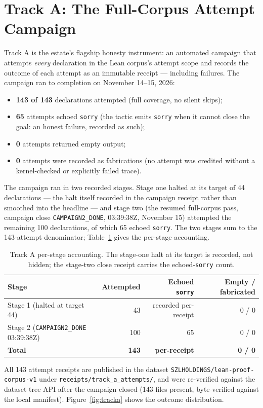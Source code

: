 
\section{Track A: The Full-Corpus Attempt Campaign}
\label{sec:tracka}

Track A is the estate's flagship honesty instrument: an automated campaign that attempts \emph{every} declaration in the Lean corpus's attempt scope and records the outcome of each attempt as an immutable receipt --- including failures. The campaign ran to completion on November 14--15, 2026:

\begin{itemize}
\item \textbf{143 of 143} declarations attempted (full coverage, no silent skips);
\item \textbf{65} attempts echoed \texttt{sorry} (the tactic emits \texttt{sorry} when it cannot close the goal: an honest failure, recorded as such);
\item \textbf{0} attempts returned empty output;
\item \textbf{0} attempts were recorded as fabrications (no attempt was credited without a kernel-checked or explicitly failed trace).
\end{itemize}

The campaign ran in two recorded stages. Stage one halted at its target of 44 declarations --- the halt itself recorded in the campaign receipt rather than smoothed into the headline --- and stage two (the resumed full-corpus pass, campaign close \texttt{CAMPAIGN2\_DONE}, 03:39:38Z, November 15) attempted the remaining 100 declarations, of which 65 echoed \texttt{sorry}. The two stages sum to the 143-attempt denominator; Table~\ref{tab:stages} gives the per-stage accounting.

\begin{table}[htbp]
\centering
\small
\begin{tabular}{lrrr}
\toprule
\textbf{Stage} & \textbf{Attempted} & \textbf{Echoed \texttt{sorry}} & \textbf{Empty / fabricated} \\
\midrule
Stage 1 (halted at target 44) & 43 & recorded per-receipt & 0 / 0 \\
Stage 2 (\texttt{CAMPAIGN2\_DONE} 03:39:38Z) & 100 & 65 & 0 / 0 \\
\midrule
\textbf{Total} & \textbf{143} & \textbf{per-receipt} & \textbf{0 / 0} \\
\bottomrule
\end{tabular}
\caption{Track A per-stage accounting. The stage-one halt at its target is recorded, not hidden; the stage-two close receipt carries the echoed-\texttt{sorry} count.}
\label{tab:stages}
\end{table} All 143 attempt receipts are published in the dataset \texttt{SZLHOLDINGS/lean-proof-corpus-v1} under \texttt{receipts/track\_a\_attempts/}, and were re-verified against the dataset tree API after the campaign closed (143 files present, byte-verified against the local manifest). Figure~\ref{fig:tracka} shows the outcome distribution.

